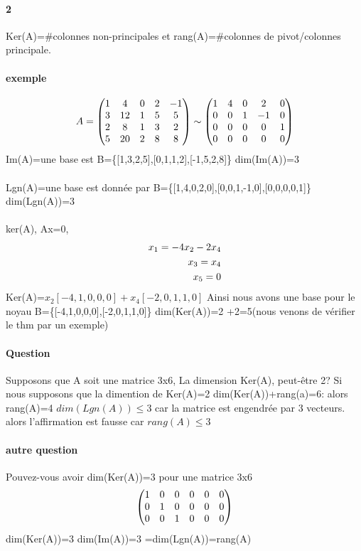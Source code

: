 \documentclass[a4paper,10pt]{article}
\begin{document}
\paragraph{2}
Ker(A)=\#colonnes non-principales et rang(A)=\#colonnes de pivot/colonnes principale.
\paragraph{exemple}
\[
A=
\begin{pmatrix}
 1&4&0&2&-1\cr
 3&12&1&5&5\cr
 2&8&1&3&2\cr
 5&20&2&8&8\cr
\end{pmatrix}
\sim
\begin{pmatrix}
 1&4&0&2&0\cr
 0&0&1&-1&0\cr
 0&0&0&0&1\cr
 0&0&0&0&0\cr
\end{pmatrix}
\]
\newline
Im(A)=une base est B=\{[1,3,2,5],[0,1,1,2],[-1,5,2,8]\}
\newline
dim(Im(A))=3
\paragraph{}
Lgn(A)=une base est donnée par B=\{[1,4,0,2,0],[0,0,1,-1,0],[0,0,0,0,1]\}
\newline
dim(Lgn(A))=3
\paragraph{}
ker(A), Ax=0, 
\begin{eqnarray}
 x_1=-4x_2-2x_4\cr
 x_3=x_4\cr
 x_5=0\cr
\end{eqnarray}
Ker(A)=$x_2[-4,1,0,0,0]+x_4[-2,0,1,1,0]$
\newline
Ainsi nous avons une base pour le noyau  B=\{[-4,1,0,0,0],[-2,0,1,1,0]\}
\newline
dim(Ker(A))=2
+2=5(nous venons de vérifier le thm par un exemple)
\paragraph{Question}
Supposons que A soit une matrice 3x6, La dimension Ker(A), peut-être 2?
\newline
Si nous supposons que la dimention de Ker(A)=2 
\newline
dim(Ker(A))+rang(a)=6: alors rang(A)=4
\newline
$dim(Lgn(A))\leq 3$ car la matrice est engendrée par 3 vecteurs. 
\newline
alors l'affirmation est fausse car $rang(A)\leq 3$
\paragraph{autre question}
Pouvez-vous avoir dim(Ker(A))=3 pour une matrice 3x6
\newline
\[
\begin{pmatrix}
 1&0&0&0&0&0\cr
 0&1&0&0&0&0\cr
 0&0&1&0&0&0\cr
\end{pmatrix}
\]
\newline
dim(Ker(A))=3
\newline
dim(Im(A))=3
\newline
=dim(Lgn(A))=rang(A)
\end{document}

